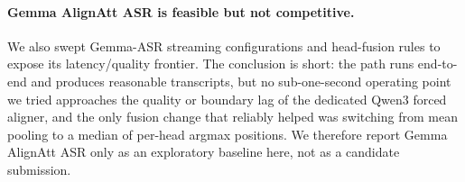 \documentclass[11pt]{article}
\begin{document}
\paragraph{Gemma AlignAtt ASR is feasible but not competitive.}
We also swept Gemma-ASR streaming configurations and head-fusion rules to
expose its latency/quality frontier. The conclusion is short: the path runs
end-to-end and produces reasonable transcripts, but no sub-one-second
operating point we tried approaches the quality or boundary lag of the
dedicated Qwen3 forced aligner, and the only fusion change that reliably
helped was switching from mean pooling to a median of per-head argmax
positions. We therefore report Gemma AlignAtt ASR only as an exploratory
baseline here, not as a candidate submission.
\end{document}
